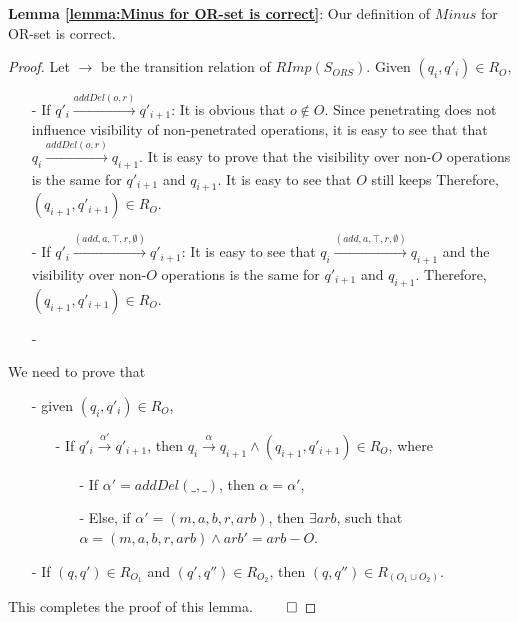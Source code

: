 {\noindent \bf Lemma \ref{lemma:Minus for OR-set is correct}}: Our definition of $Minus$ for OR-set is correct.

\begin {proof} 

Let $\rightarrow$ be the transition relation of $RImp(S_{\textit{ORS}})$. Given $(q_i,q'_i) \in R_{O}$, 

\begin{itemize}
\setlength{\itemsep}{0.5pt}
\item[-] If $q'_i {\xrightarrow{addDel(o,r)}} q'_{i+1}$: It is obvious that $o \notin O$. Since penetrating does not influence visibility of non-penetrated operations, it is easy to see that that $q_i {\xrightarrow{addDel(o,r)}} q_{i+1}$. It is easy to prove that the visibility over non-$O$ operations is the same for $q'_{i+1}$ and $q_{i+1}$. It is easy to see that $O$ still keeps  Therefore, $(q_{i+1},q'_{i+1}) \in R_{O}$. 

\item[-] If $q'_i {\xrightarrow{(add,a,\top,r,\emptyset)}} q'_{i+1}$: It is easy to see that $q_i {\xrightarrow{(add,a,\top,r,\emptyset)}} q_{i+1}$ and the visibility over non-$O$ operations is the same for $q'_{i+1}$ and $q_{i+1}$. Therefore, $(q_{i+1},q'_{i+1}) \in R_{O}$. 

\item[-] 
\end{itemize}



We need to prove that 

\begin{itemize}
\setlength{\itemsep}{0.5pt}
\item[-] given $(q_i,q'_i) \in R_{O}$,

    \begin{itemize}
    \setlength{\itemsep}{0.5pt} 
    \item[-] If $q'_i {\xrightarrow{\alpha'}} q'_{i+1}$, then $q_i {\xrightarrow{\alpha}} q_{i+1} \wedge (q_{i+1},q'_{i+1}) \in R_{O}$, where

        \begin{itemize}
        \setlength{\itemsep}{0.5pt}
        \item[-] If $\alpha' = addDel(\_,\_)$, then $\alpha = \alpha'$,

        \item[-] Else, if $\alpha'=(m,a,b,r,arb)$, then $\exists arb$, such that $\alpha=(m,a,b,r,arb) \wedge arb' = arb - O$.
        \end{itemize}
    \end{itemize}

\item[-] If $(q,q') \in R_{ O_1 }$ and $(q',q'') \in R_{ O_2 }$, then $(q,q'') \in R_{ ( O_1 \cup O_2 ) }$.
\end{itemize}

This completes the proof of this lemma. $\qed$ 
\end {proof}





